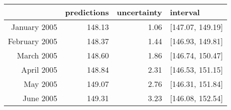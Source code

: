 \begin{table}[ht]
\begin{center}
\begin{tabular}{rrrl}
  \hline
 & predictions & uncertainty & interval \\ 
  \hline
January 2005 & 148.13 & 1.06 & [147.07, 149.19] \\ 
  February 2005 & 148.37 & 1.44 & [146.93, 149.81] \\ 
  March 2005 & 148.60 & 1.86 & [146.74, 150.47] \\ 
  April 2005 & 148.84 & 2.31 & [146.53, 151.15] \\ 
  May 2005 & 149.07 & 2.76 & [146.31, 151.84] \\ 
  June 2005 & 149.31 & 3.23 & [146.08, 152.54] \\ 
   \hline
\end{tabular}
\end{center}
\end{table}
